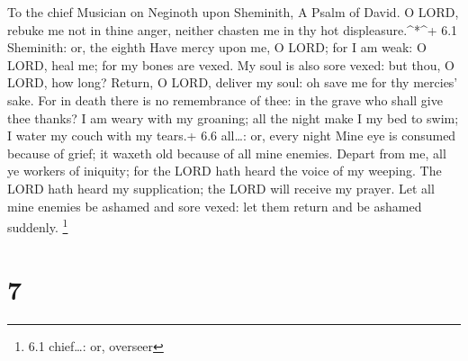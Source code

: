 To the chief Musician on Neginoth upon Sheminith, A Psalm of David.
 O LORD, rebuke me not in thine anger, neither chasten me in
thy hot displeasure.\^{}*\^{}+ 6.1 Sheminith: or, the eighth
 Have mercy upon me, O LORD; for I am weak: O LORD, heal me;
for my bones are vexed.  My soul is also sore vexed: but
thou, O LORD, how long?  Return, O LORD, deliver my soul: oh
save me for thy mercies' sake.  For in death there is no
remembrance of thee: in the grave who shall give thee thanks?
 I am weary with my groaning; all the night make I my bed to
swim; I water my couch with my tears.+ 6.6 all\ldots: or, every night
 Mine eye is consumed because of grief; it waxeth old
because of all mine enemies.  Depart from me, all ye workers
of iniquity; for the LORD hath heard the voice of my weeping.
 The LORD hath heard my supplication; the LORD will receive
my prayer.  Let all mine enemies be ashamed and sore vexed:
let them return and be ashamed suddenly. \footnote{6.1 chief\ldots: or,
  overseer}

\hypertarget{section-6}{%
\section{7}\label{section-6}}

